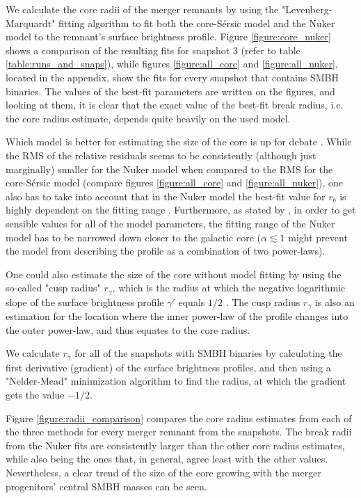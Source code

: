 \documentclass[english, oneside]{HYgradu}
\begin{document}
We calculate the core radii of the merger remnants by using the "Levenberg-Marquardt" fitting algorithm to fit both the core-Sérsic model and the Nuker model to the remnant's surface brightness profile. Figure \ref{figure:core_nuker} shows a comparison of the resulting fits for snapshot 3 (refer to table \ref{table:runs_and_snaps}), while figures \ref{figure:all_core} and \ref{figure:all_nuker}, located in the appendix, show the fits for every snapshot that contains SMBH binaries. The values of the best-fit parameters are written on the figures, and looking at them, it is clear that the exact value of the best-fit break radius, i.e. the core radius estimate, depends quite heavily on the used model.

Which model is better for estimating the size of the core is up for debate \citep{Lauer2007, Dullo2012}. While the RMS of the relative residuals seems to be consistently (although just marginally) smaller for the Nuker model when compared to the RMS for the core-Sérsic model (compare figures \ref{figure:all_core} and \ref{figure:all_nuker}), one also has to take into account that in the Nuker model the best-fit value for $r_b$ is highly dependent on the fitting range \citep{Graham2003Nuker}. Furthermore, as stated by \cite{Rantala2018}, in order to get sensible values for all of the model parameters, the fitting range of the Nuker model has to be narrowed down closer to the galactic core ($\alpha \lesssim 1$ might prevent the model from describing the profile as a combination of two power-laws).

One could also estimate the size of the core without model fitting by using the so-called "cusp radius" $r_\gamma$, which is the radius at which the negative logarithmic slope of the surface brightness profile $\gamma'$ equals $1/2$ \citep{Carollo1997, Lauer2007Cusp}. The cusp radius $r_\gamma$ is also an estimation for the location where the inner power-law of the profile changes into the outer power-law, and thus equates to the core radius. 

We calculate $r_\gamma$ for all of the snapshots with SMBH binaries by calculating the first derivative (gradient) of the surface brightness profiles, and then using a "Nelder-Mead" minimization algorithm to find the radius, at which the gradient gets the value $-1/2$. 

Figure \ref{figure:radii_comparison} compares the core radius estimates from each of the three methods for every merger remnant from the snapshots. The break radii from the Nuker fits are consistently larger than the other core radius estimates, while also being the ones that, in general, agree least with the other values. Nevertheless, a clear trend of the size of the core growing with the merger progenitors' central SMBH masses can be seen.
\end{document}
